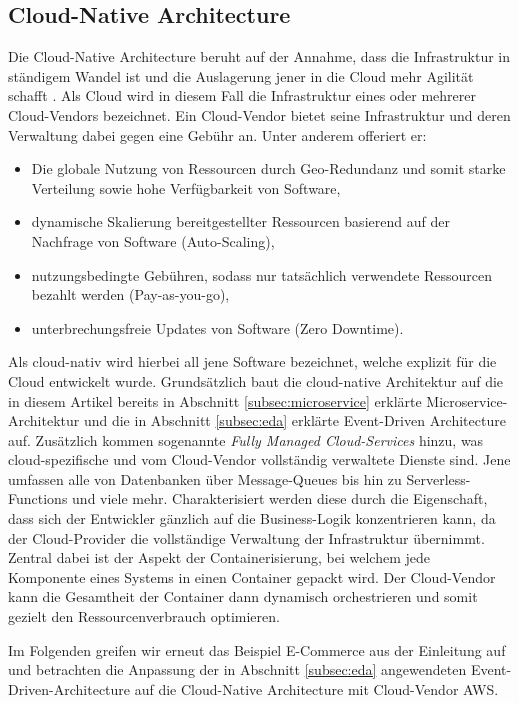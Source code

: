 \documentclass[acmtog]{acmart}
\begin{document}
\subsection{Cloud-Native Architecture}
Die Cloud-Native Architecture beruht auf der Annahme, dass die Infrastruktur in ständigem Wandel ist und die Auslagerung jener in die Cloud mehr Agilität schafft \cite{cloudNative}.
Als Cloud wird in diesem Fall die Infrastruktur eines oder mehrerer Cloud-Vendors bezeichnet.
Ein Cloud-Vendor bietet seine Infrastruktur und deren Verwaltung dabei gegen eine Gebühr an.
Unter anderem offeriert er:
\begin{itemize}
  \item Die globale Nutzung von Ressourcen durch Geo-Redundanz und somit starke Verteilung sowie hohe Verfügbarkeit von Software,
  \item dynamische Skalierung bereitgestellter Ressourcen basierend auf der Nachfrage von Software (Auto-Scaling),
  \item nutzungsbedingte Gebühren, sodass nur tatsächlich verwendete Ressourcen bezahlt werden (Pay-as-you-go),
  \item unterbrechungsfreie Updates von Software (Zero Downtime).
\end{itemize}

Als cloud-nativ wird hierbei all jene Software bezeichnet, welche explizit für die Cloud entwickelt wurde.
Grundsätzlich baut die cloud-native Architektur auf die in diesem Artikel bereits in Abschnitt \ref{subsec:microservice} erklärte Microservice-Architektur und die
in Abschnitt \ref{subsec:eda} erklärte Event-Driven Architecture auf.
Zusätzlich kommen sogenannte \textit{Fully Managed Cloud-Services} hinzu, was cloud-spezifische und vom Cloud-Vendor vollständig verwaltete Dienste sind.
Jene umfassen alle von Datenbanken über Message-Queues bis hin zu Serverless-Functions und viele mehr.
Charakterisiert werden diese durch die Eigenschaft, dass sich der Entwickler gänzlich auf die Business-Logik konzentrieren kann, da der Cloud-Provider
die vollständige Verwaltung der Infrastruktur übernimmt.
Zentral dabei ist der Aspekt der Containerisierung, bei welchem jede Komponente eines Systems in einen Container gepackt wird.
Der Cloud-Vendor kann die Gesamtheit der Container dann dynamisch orchestrieren und somit gezielt den Ressourcenverbrauch optimieren.

Im Folgenden greifen wir erneut das Beispiel E-Commerce aus der Einleitung auf und betrachten die Anpassung der in
Abschnitt \ref{subsec:eda} angewendeten Event-Driven-Architecture auf die Cloud-Native Architecture mit Cloud-Vendor AWS\@.
\end{document}
